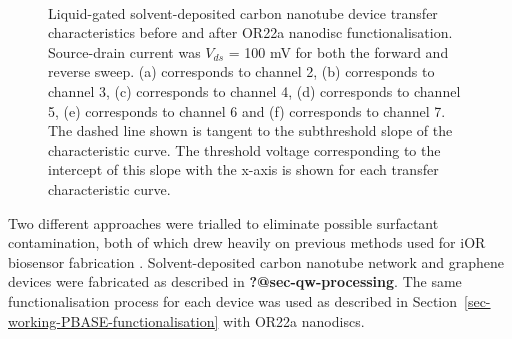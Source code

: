 \documentclass[
  a4paper,
]{scrbook}
\begin{document}
\begin{figure}
\begin{minipage}[t]{0.45\linewidth}
{{}

}

\end{minipage}%
%
\begin{minipage}[t]{0.01\linewidth}

{\centering 

~

}

\end{minipage}%

\caption{\label{fig-solvent-deposited-sensing-TX}Liquid-gated
solvent-deposited carbon nanotube device transfer characteristics before
and after OR22a nanodisc functionalisation. Source-drain current was
\(V_{ds}\) = 100 mV for both the forward and reverse sweep. (a)
corresponds to channel 2, (b) corresponds to channel 3, (c) corresponds
to channel 4, (d) corresponds to channel 5, (e) corresponds to channel 6
and (f) corresponds to channel 7. The dashed line shown is tangent to
the subthreshold slope of the characteristic curve. The threshold
voltage corresponding to the intercept of this slope with the x-axis is
shown for each transfer characteristic curve.}

\end{figure}

Two different approaches were trialled to eliminate possible surfactant
contamination, both of which drew heavily on previous methods used for
iOR biosensor fabrication \autocite{Murugathas2019b,Murugathas2020}.
Solvent-deposited carbon nanotube network and graphene devices were
fabricated as described in \textbf{?@sec-qw-processing}. The same
functionalisation process for each device was used as described in
Section~\ref{sec-working-PBASE-functionalisation} with OR22a nanodiscs.
\end{document}
